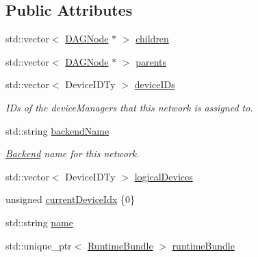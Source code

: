 \subsection*{Public Attributes}
\begin{DoxyCompactItemize}
\item 
std\+::vector$<$ \hyperlink{structglow_1_1runtime_1_1_d_a_g_node}{D\+A\+G\+Node} $\ast$ $>$ \hyperlink{structglow_1_1runtime_1_1_d_a_g_node_ad17c934bef11d35dafe4101c7baccd46}{children}
\item 
std\+::vector$<$ \hyperlink{structglow_1_1runtime_1_1_d_a_g_node}{D\+A\+G\+Node} $\ast$ $>$ \hyperlink{structglow_1_1runtime_1_1_d_a_g_node_aa7caed7ac1821e8f5be54dbc252eb6ed}{parents}
\item 
\mbox{\label{structglow_1_1runtime_1_1_d_a_g_node_a27ed8e91ec7dc700083d7c11e2302a7a}} 
std\+::vector$<$ Device\+I\+D\+Ty $>$ \hyperlink{structglow_1_1runtime_1_1_d_a_g_node_a27ed8e91ec7dc700083d7c11e2302a7a}{device\+I\+Ds}
\begin{DoxyCompactList}\small\item\em I\+Ds of the device\+Managers that this network is assigned to. \end{DoxyCompactList}\item 
\mbox{\label{structglow_1_1runtime_1_1_d_a_g_node_a27896f2ef7d075261697cf3b6c4fe188}} 
std\+::string \hyperlink{structglow_1_1runtime_1_1_d_a_g_node_a27896f2ef7d075261697cf3b6c4fe188}{backend\+Name}
\begin{DoxyCompactList}\small\item\em \hyperlink{classglow_1_1_backend}{Backend} name for this network. \end{DoxyCompactList}\item 
std\+::vector$<$ Device\+I\+D\+Ty $>$ \hyperlink{structglow_1_1runtime_1_1_d_a_g_node_a8954611af692b9637220ab94417fa67b}{logical\+Devices}
\item 
unsigned \hyperlink{structglow_1_1runtime_1_1_d_a_g_node_a63142a24d84bd3397f08a6aab8b4e26b}{current\+Device\+Idx} \{0\}
\item 
std\+::string \hyperlink{structglow_1_1runtime_1_1_d_a_g_node_aab073cf1b6f7dfd082d2b9e25c9a9537}{name}
\item 
std\+::unique\+\_\+ptr$<$ \hyperlink{classglow_1_1runtime_1_1_runtime_bundle}{Runtime\+Bundle} $>$ \hyperlink{structglow_1_1runtime_1_1_d_a_g_node_a39192dae64c44795d60b4cc36e8d7e1d}{runtime\+Bundle}

\end{DoxyCompactItemize}
